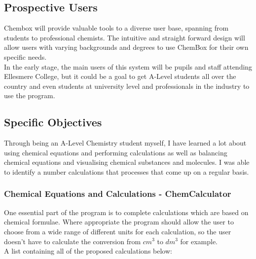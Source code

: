 \documentclass[a4paper,12pt]{article}
\begin{document}
\newpage

\subsection{Prospective Users}

Chembox will provide valuable tools to a diverse user base, spanning from students to professional chemists. The intuitive and straight forward design will allow users with varying backgrounds and degrees to use ChemBox for their own specific needs.\\
In the early stage, the main users of this system will be pupils and staff attending Ellesmere College, but it could be a goal to get A-Level students all over the country and even students at university level and professionals in the industry to use the program.

\subsection{Specific Objectives}

Through being an A-Level Chemistry student myself, I have learned a lot about using chemical equations and performing calculations as well as balancing chemical equations and visualising chemical substances and molecules. I was able to identify a number calculations that processes that come up on a regular basis.

\subsubsection{Chemical Equations and Calculations - ChemCalculator}

One essential part of the program is to complete calculations which are based on chemical formulae.
Where appropriate the program should allow the user to choose from a wide range of different units for each calculation, so the user doesn't have to calculate the conversion from $cm^{3}$ to $dm^{3}$ for example.\\
\linebreak
A list containing all of the proposed calculations below:\\
\linebreak
\end{document}
